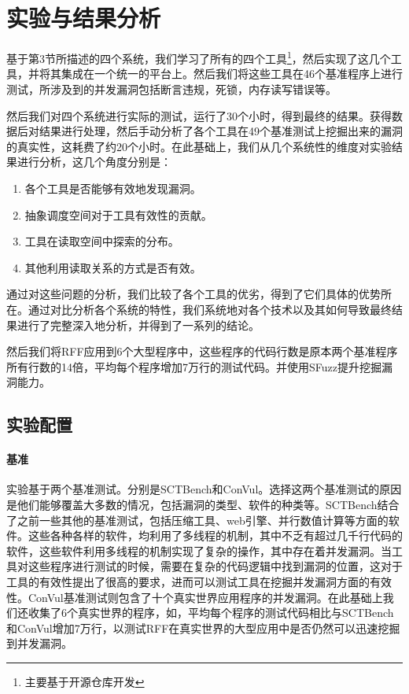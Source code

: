 \clearpage

\section{实验与结果分析}

基于第3节所描述的四个系统，我们学习了所有的四个工具\footnote{主要基于开源仓库\cite{figshareGreyboxFuzzing}开发}，然后实现了这几个工具，并将其集成在一个统一的平台上。然后我们将这些工具在46个基准程序上进行测试，所涉及到的并发漏洞包括断言违规，死锁，内存读写错误等。

然后我们对四个系统进行实际的测试，运行了30个小时，得到最终的结果。获得数据后对结果进行处理，然后手动分析了各个工具在49个基准测试上挖掘出来的漏洞的真实性，这耗费了约20个小时。在此基础上，我们从几个系统性的维度对实验结果进行分析，这几个角度分别是：

\begin{enumerate}
\item 各个工具是否能够有效地发现漏洞。
\item 抽象调度空间对于工具有效性的贡献。
\item 工具在读取空间中探索的分布。
\item 其他利用读取关系的方式是否有效。
\end{enumerate}

通过对这些问题的分析，我们比较了各个工具的优劣，得到了它们具体的优势所在。通过对比分析各个系统的特性，我们系统地对各个技术以及其如何导致最终结果进行了完整深入地分析，并得到了一系列的结论。

然后我们将RFF应用到6个大型程序中，这些程序的代码行数是原本两个基准程序所有行数的14倍，平均每个程序增加7万行的测试代码。并使用SFuzz提升挖掘漏洞能力。

\subsection{实验配置}

\paragraph{基准}实验基于两个基准测试。分别是SCTBench\cite{githubGitHubMcimperialsctbench, wen2022controlled}和ConVul\cite{cai2019detecting}。选择这两个基准测试的原因是他们能够覆盖大多数的情况，包括漏洞的类型、软件的种类等。SCTBench结合了之前一些其他的基准测试，包括压缩工具\cite{yu2009case}、web引擎\cite{jalbert2011radbench}、并行数值计算等方面的软件。这些各种各样的软件，均利用了多线程的机制，其中不乏有超过几千行代码的软件，这些软件利用多线程的机制实现了复杂的操作，其中存在着并发漏洞。当工具对这些程序进行测试的时候，需要在复杂的代码逻辑中找到漏洞的位置，这对于工具的有效性提出了很高的要求，进而可以测试工具在挖掘并发漏洞方面的有效性。ConVul基准测试则包含了十个真实世界应用程序的并发漏洞。在此基础上我们还收集了6个真实世界的程序，如，平均每个程序的测试代码相比与SCTBench和ConVul增加7万行，以测试RFF在真实世界的大型应用中是否仍然可以迅速挖掘到并发漏洞。

